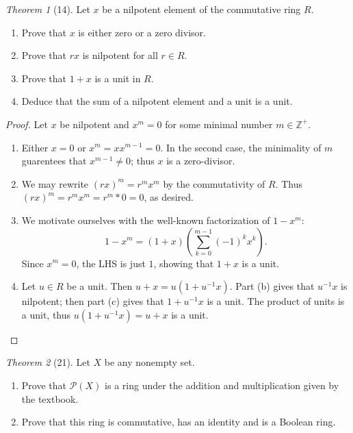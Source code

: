 \documentclass[12pt]{article}
\theoremstyle{remark}
\theoremstyle{named}
\newtheorem*{theorem}{Theorem}
\newcommand{\Z}{\mathbb Z}
\begin{document}
\begin{theorem}[14]
    Let \(x\) be a nilpotent element of the commutative ring \(R\).
    \begin{enumerate}
        \item Prove that \(x\) is either zero or a zero divisor.
        \item Prove that \(rx\) is nilpotent for all \(r \in R\).
        \item Prove that \(1 + x\) is a unit in \(R\). 
        \item Deduce that the sum of a nilpotent element and a unit is a unit.
    \end{enumerate}
\end{theorem}

\begin{proof}
    Let \(x\) be nilpotent and \(x^m = 0\) for some minimal number \(m \in \Z^+\).
    \begin{enumerate}
        \item Either \(x = 0\) or \(x^m = xx^{m - 1} = 0\). In the second case, the minimality of \(m\) guarentees that \(x^{m - 1} \neq 0\); thus \(x\) is a zero-divisor. 
         
        \item We may rewrite \((rx)^m = r^mx^m\) by the commutativity of \(R\). Thus \((rx)^m = r^mx^m = r^m*0 = 0\), as desired.
        
        \item We motivate ourselves with the well-known factorization of \(1 - x^m\):
        \[1 - x^m = (1 + x)\left(\sum_{k = 0}^{m - 1}(-1)^kx^k\right).\] 
        Since \(x^m = 0\), the LHS is just \(1\), showing that \(1 + x\) is a unit.

        \item Let \(u \in R\) be a unit. Then \(u + x = u(1 + u^{-1}x)\). Part (b) gives that \(u^{-1}x\) is nilpotent; then part (c) gives that \(1 + u^{-1}x\) is a unit. The product of units is a unit, thus \(u(1 + u^{-1}x) = u + x\) is a unit. 
    \end{enumerate}
\end{proof}

\begin{theorem}[21]
    Let \(X\) be any nonempty set.
    \begin{enumerate}
        \item Prove that \(\mathcal P (X)\) is a ring under the addition and multiplication given by the textbook.
        \item Prove that this ring is commutative, has an identity and is a Boolean ring.
    \end{enumerate}
\end{theorem}
\end{document}
